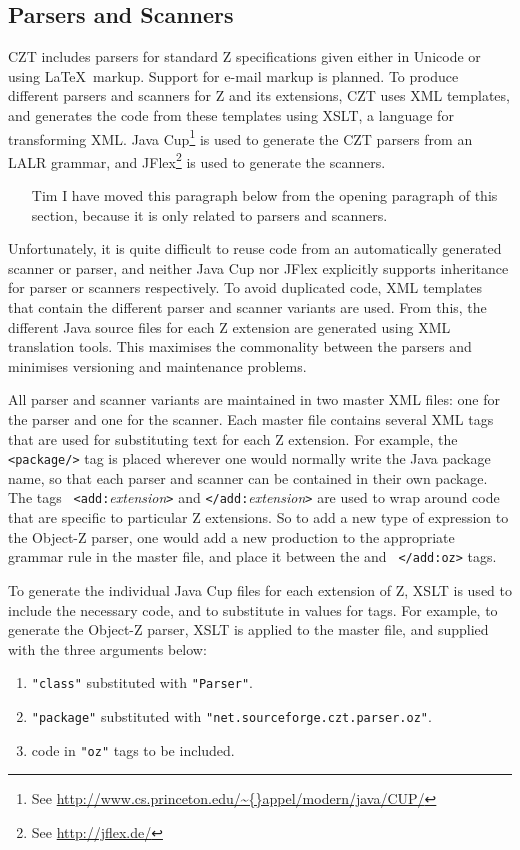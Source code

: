 \documentclass{llncs}
\begin{document}
\subsection{Parsers and Scanners}

  CZT includes parsers for standard Z specifications given either in
  Unicode or using \LaTeX\ markup.  Support for e-mail markup is
  planned. To produce different parsers and scanners for Z and its
  extensions, CZT uses XML templates, and generates the code from these
  templates using XSLT, a language for transforming XML. Java
  Cup\footnote{See
  \url{http://www.cs.princeton.edu/\~{}appel/modern/java/CUP/}} is
  used to generate the CZT parsers from an LALR grammar, and
  JFlex\footnote{See \url{http://jflex.de/}} is used to generate the
  scanners.

  \begin{itemize}
    \item[Tim] I have moved this paragraph below from the opening
    paragraph of this section, because it is only related to parsers
    and scanners.
  \end{itemize}

  Unfortunately, it is quite difficult to reuse code from an
  automatically generated scanner or parser, and neither Java Cup nor
  JFlex explicitly supports inheritance for parser or scanners
  respectively.  To avoid duplicated code, XML templates that contain
  the different parser and scanner variants are used. From this, the
  different Java source files for each Z extension are generated using
  XML translation tools.  This maximises the commonality between the
  parsers and minimises versioning and maintenance problems.

All parser and scanner variants are maintained in two master XML
files: one for the parser and one for the scanner. Each master file
contains several XML tags that are used for substituting text for each
Z extension. For example, the {\tt <package/>} tag is placed wherever
one would normally write the Java package name, so that each parser
and scanner can be contained in their own package. The tags {\tt
<add:}{\em extension}{\tt >} and {\tt </add:}{\em extension}{\tt >}
are used to wrap around code that are specific to particular Z
extensions. So to add a new type of expression to the Object-Z parser,
one would add a new production to the appropriate grammar rule in the
master file, and place it between the {\tt <add:oz>} and {\tt
</add:oz>} tags.

To generate the individual Java Cup files for each extension of Z,
XSLT is used to include the necessary code, and to substitute in
values for tags. For example, to generate the Object-Z parser, XSLT is
applied to the master file, and supplied with the three arguments
below:
\begin{enumerate}
  \item {\tt "class"} substituted with {\tt "Parser"}.
  \item {\tt "package"} substituted with {\tt "net.sourceforge.czt.parser.oz"}.
  \item code in {\tt "oz"} tags to be included.
\end{enumerate}
\end{document}
